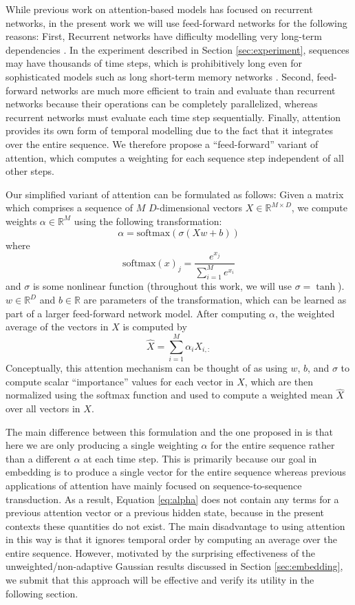 \documentclass{article}
\begin{document}
While previous work on attention-based models has focused on recurrent networks, in the present work we will use feed-forward networks for the following reasons:
First, Recurrent networks have difficulty modelling very long-term dependencies \cite{bengio1994learning}.
In the experiment described in Section \ref{sec:experiment}, sequences may have thousands of time steps, which is prohibitively long even for sophisticated models such as long short-term memory networks \cite{hochreiter1997long}.
Second, feed-forward networks are much more efficient to train and evaluate than recurrent networks because their operations can be completely parallelized, whereas recurrent networks must evaluate each time step sequentially.
Finally, attention provides its own form of temporal modelling due to the fact that it integrates over the entire sequence.
We therefore propose a ``feed-forward'' variant of attention, which computes a weighting for each sequence step independent of all other steps.

Our simplified variant of attention can be formulated as follows:
Given a matrix which comprises a sequence of $M$ $D$-dimensional vectors $X \in \mathbb{R}^{M \times D}$, we compute weights $\alpha \in \mathbb{R}^M$ using the following transformation:
\begin{equation}
\label{eq:alpha}
\alpha = \mathrm{softmax}(\sigma(Xw + b))
\end{equation}
where
$$
\mathrm{softmax}(x)_j = \frac{e^{x_j}}{\sum_{i = 1}^M e^{x_i}}
$$
and $\sigma$ is some nonlinear function (throughout this work, we will use $\sigma = \tanh$).
$w \in \mathbb{R}^D$ and $b \in \mathbb{R}$ are parameters of the transformation, which can be learned as part of a larger feed-forward network model.
After computing $\alpha$, the weighted average of the vectors in $X$ is computed by
$$
\hat{X} = \sum_{i = 1}^M \alpha_i X_{i, :}
$$
Conceptually, this attention mechanism can be thought of as using $w$, $b$, and $\sigma$ to compute scalar ``importance'' values for each vector in $X$, which are then normalized using the softmax function and used to compute a weighted mean $\hat{X}$ over all vectors in $X$.

The main difference between this formulation and the one proposed in \cite{bahdanau2014neural, cho2015describing} is that here we are only producing a single weighting $\alpha$ for the entire sequence rather than a different $\alpha$ at each time step.
This is primarily because our goal in embedding is to produce a single vector for the entire sequence whereas previous applications of attention have mainly focused on sequence-to-sequence transduction.
As a result, Equation \ref{eq:alpha} does not contain any terms for a previous attention vector or a previous hidden state, because in the present contexts these quantities do not exist.
The main disadvantage to using attention in this way is that it ignores temporal order by computing an average over the entire sequence.
However, motivated by the surprising effectiveness of the unweighted/non-adaptive Gaussian results discussed in Section \ref{sec:embedding}, we submit that this approach will be effective and verify its utility in the following section.




\end{document}
